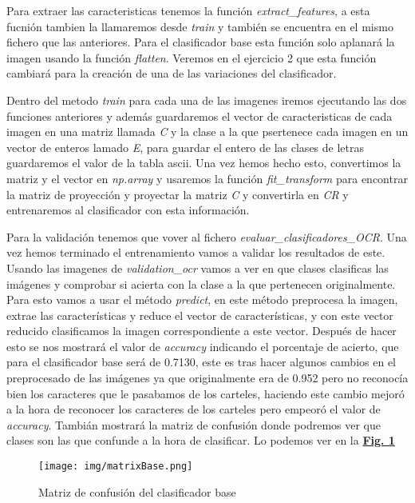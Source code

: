 \documentclass[a4paper, 12pt]{article}
\begin{document}
Para extraer las caracteristicas tenemos la función \textit{extract\_features}, a esta fucnión tambien la llamaremos desde \textit{train} y también se encuentra en el mismo fichero que las anteriores. Para el clasificador base esta función solo aplanará la imagen usando la función \textit{flatten}. Veremos en el ejercicio 2 que esta función cambiará para la creación de una de las variaciones del clasificador.

Dentro del metodo \textit{train} para cada una de las imagenes iremos ejecutando las dos funciones anteriores y además guardaremos el vector de caracteristicas de cada imagen en una matriz llamada \textit{C} y la clase a la que psertenece cada imagen en un vector de enteros lamado \textit{E}, para guardar el entero de las clases de letras guardaremos el valor de la tabla ascii. Una vez hemos hecho esto, convertimos la matriz y el vector en \textit{np.array} y usaremos la función \textit{fit\_transform} para encontrar la matriz de proyección y proyectar la matriz \textit{C} y convertirla en \textit{CR} y entrenaremos al clasificador con esta información. 

Para la validación tenemos que vover al fichero \textit{evaluar\_clasificadores\_OCR}. Una vez hemos terminado el entrenamiento vamos a validar los resultados de este. Usando las imagenes de \textit{validation\_ocr} vamos a ver en que clases clasificas las imágenes y comprobar si acierta con la clase a la que pertenecen originalmente. Para esto vamos a usar el método \textit{predict}, en este método preprocesa la imagen, extrae las características y reduce el vector de características, y con este vector reducido clasificamos la imagen correspondiente a este vector. Después de hacer esto se nos mostrará el valor de \textit{accuracy} indicando el porcentaje de acierto, que para el clasificador base será de 0.7130, este es tras hacer algunos cambios en el preprocesado de las imágenes ya que originalmente era de 0.952 pero no reconocía bien los caracteres que le pasabamos de los carteles, haciendo este cambio mejoró a la hora de reconocer los caracteres de los carteles pero empeoró el valor de \textit{accuracy}. Tambián mostrará la matriz de confusión donde podremos ver que clases son las que confunde a la hora de clasificar. 
Lo podemos ver en la \textbf{\hyperref[fig:normalizacion]{Fig. 1}}

\begin{figure}[h]
	\centering
	\texttt{[image: img/matrixBase.png]}
 	\caption{Matriz de confusión del clasificador base}\vspace{0.5cm}
	\label{fig:normalizacion}
\end{figure}
\end{document}
